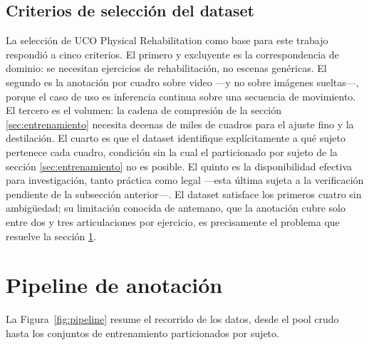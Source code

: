 \documentclass[10pt,a4paper,twocolumn]{article}
\begin{document}
\subsection{Criterios de selección del dataset}
La selección de UCO Physical Rehabilitation como base para este trabajo
respondió a cinco criterios. El primero y excluyente es la correspondencia de
dominio: se necesitan ejercicios de rehabilitación, no escenas genéricas. El
segundo es la anotación por cuadro sobre video —y no sobre imágenes
sueltas—, porque el caso de uso es inferencia continua sobre una secuencia de
movimiento. El tercero es el volumen: la cadena de compresión de la sección
\ref{sec:entrenamiento} necesita decenas de miles de cuadros para el ajuste
fino y la destilación. El cuarto es que el dataset identifique explícitamente
a qué sujeto pertenece cada cuadro, condición sin la cual el particionado por
sujeto de la sección \ref{sec:entrenamiento} no es posible. El quinto es la
disponibilidad efectiva para investigación, tanto práctica como legal —esta
última sujeta a la verificación pendiente de la subsección anterior—. El
dataset satisface los primeros cuatro sin ambigüedad; su limitación conocida
de antemano, que la anotación cubre solo entre dos y tres articulaciones por
ejercicio, es precisamente el problema que resuelve la sección
\ref{sec:pipeline}.

\section{Pipeline de anotación}
\label{sec:pipeline}

La Figura~\ref{fig:pipeline} resume el recorrido de los datos, desde el pool
crudo hasta los conjuntos de entrenamiento particionados por sujeto.
\end{document}
